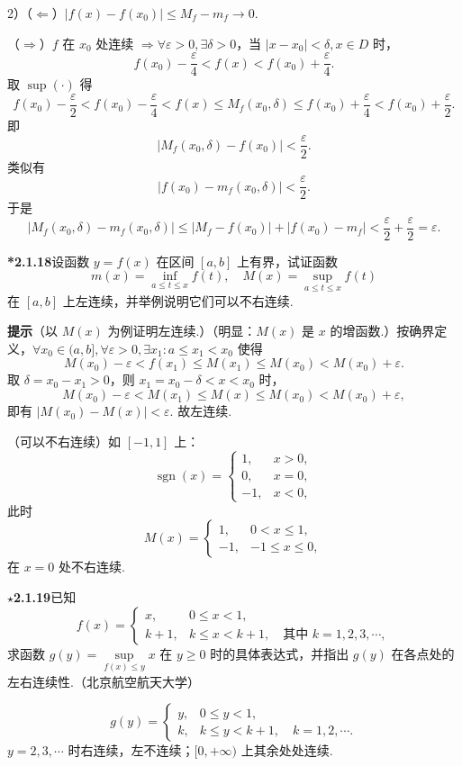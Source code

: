 \documentclass[UTF8,12pt,a4paper,fontset=fandol]{ctexart}
\begin{document}
2）（$\Leftarrow$）$|f(x)-f(x_0)|\le M_f-m_f\to0$.

（$\Rightarrow$）$f$ 在 $x_0$ 处连续 $\Rightarrow \forall\varepsilon>0,\exists\delta>0$，当 $|x-x_0|<\delta,x\in D$ 时，
\[
  f(x_0)-\frac\varepsilon4<f(x)<f(x_0)+\frac\varepsilon4.
\]
取 $\sup(\cdot)$ 得
\[
  f(x_0)-\frac\varepsilon2<f(x_0)-\frac\varepsilon4<f(x)\le M_f(x_0,\delta)
  \le f(x_0)+\frac\varepsilon4<f(x_0)+\frac\varepsilon2.
\]
即
\[
  |M_f(x_0,\delta)-f(x_0)|<\frac\varepsilon2.
\]
类似有
\[
  |f(x_0)-m_f(x_0,\delta)|<\frac\varepsilon2.
\]
于是
\[
  |M_f(x_0,\delta)-m_f(x_0,\delta)|
  \le |M_f-f(x_0)|+|f(x_0)-m_f|<\frac\varepsilon2+\frac\varepsilon2=\varepsilon.
\]

\noindent\textbf{*2.1.18}\quad 设函数 $y=f(x)$ 在区间 $[a,b]$ 上有界，试证函数
\[
  m(x)=\inf_{a\le t\le x}f(t),\quad M(x)=\sup_{a\le t\le x}f(t)
\]
在 $[a,b]$ 上左连续，并举例说明它们可以不右连续.

\noindent\textbf{提示}\quad （以 $M(x)$ 为例证明左连续.）（明显：$M(x)$ 是 $x$ 的增函数.）按确界定义，$\forall x_0\in(a,b],\forall\varepsilon>0,\exists x_1:a\le x_1<x_0$ 使得
\[
  M(x_0)-\varepsilon<f(x_1)\le M(x_1)\le M(x_0)<M(x_0)+\varepsilon.
\]
取 $\delta=x_0-x_1>0$，则 $x_1=x_0-\delta<x<x_0$ 时，
\[
  M(x_0)-\varepsilon<M(x_1)\le M(x)\le M(x_0)<M(x_0)+\varepsilon,
\]
即有 $|M(x_0)-M(x)|<\varepsilon$. 故左连续.

（可以不右连续）如 $[-1,1]$ 上：
\[
  \operatorname{sgn}(x)=
  \begin{cases}
    1, & x>0,\\
    0, & x=0,\\
    -1, & x<0,
  \end{cases}
\]
此时
\[
  M(x)=
  \begin{cases}
    1, & 0<x\le1,\\
    -1, & -1\le x\le0,
  \end{cases}
\]
在 $x=0$ 处不右连续.

\noindent\textbf{$\star$2.1.19}\quad 已知
\[
  f(x)=
  \begin{cases}
    x, & 0\le x<1,\\
    k+1, & k\le x<k+1,\quad \text{其中 }k=1,2,3,\cdots,
  \end{cases}
\]
求函数 $g(y)=\sup\limits_{f(x)\le y}x$ 在 $y\ge0$ 时的具体表达式，并指出 $g(y)$ 在各点处的左右连续性.（北京航空航天大学）

\[
  g(y)=
  \begin{cases}
    y, & 0\le y<1,\\
    k, & k\le y<k+1,\quad k=1,2,\cdots.
  \end{cases}
\]
$y=2,3,\cdots$ 时右连续，左不连续；$[0,+\infty)$ 上其余处处连续.
\end{document}
